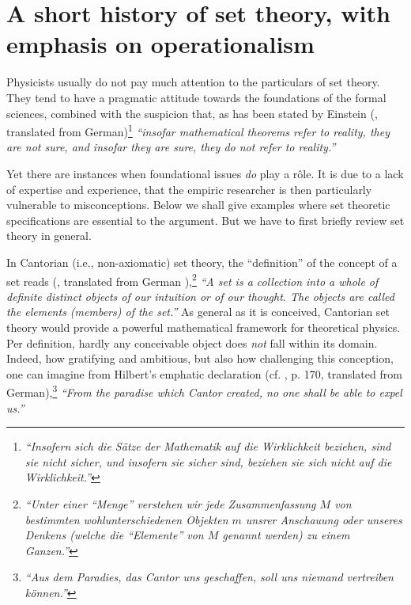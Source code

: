\newpage

\section{A short history of set theory, with emphasis on operationalism}
Physicists usually do not pay much attention to the particulars of set
theory. They tend to have
a pragmatic attitude
towards the foundations of the formal sciences, combined with the
suspicion that, as has been stated by Einstein
(\cite{einstein-math}, translated from
German)\footnote{
{\em
``Insofern sich die S\"atze der Mathematik auf die Wirklichkeit
beziehen, sind sie nicht sicher, und insofern sie sicher sind,
beziehen sie sich nicht auf die Wirklichkeit.''}}
{\em  ``insofar mathematical theorems refer to reality,
 they are not sure,
 and insofar they are sure,
 they do not refer  to reality.''}

Yet there are instances when foundational issues {\em do} play a
r\^{o}le. It is due to a lack of expertise and experience, that the
empiric researcher is then particularly vulnerable to misconceptions.
Below we shall give examples where set theoretic specifications are
essential to the argument.
But we have to first briefly review set theory in general.


In Cantorian  (i.e., non-axiomatic) set theory, the ``definition''
of the concept of a set reads
(\cite{cantor-set}, translated from German
\cite{zer-fr}),\footnote{
{\em ``Unter einer ``Menge'' verstehen wir jede Zusammenfassung $M$ von
bestimmten wohlunterschiedenen Objekten $m$ unsrer Anschauung oder
unseres Denkens (welche die ``Elemente'' von $M$ genannt werden) zu
einem Ganzen.''}}
{\em
``A set is a collection into a whole of definite distinct objects of
our intuition or of our thought. The objects are called the elements
(members) of the set.''}
As general as it is conceived, Cantorian set theory
would
provide a powerful
mathematical framework for theoretical physics.
Per definition,  hardly any conceivable object does {\em not} fall
within its domain.
Indeed, how gratifying and ambitious, but also how challenging this
conception, one can imagine from Hilbert's emphatic declaration
(cf. \cite{hil-26}, p. 170,
translated from German),\footnote{
{\em ``Aus dem Paradies, das Cantor uns geschaffen, soll uns niemand
vertreiben k\"onnen.''}}
{\em ``From the paradise which  Cantor created, no one shall
be able to expel us.''}



